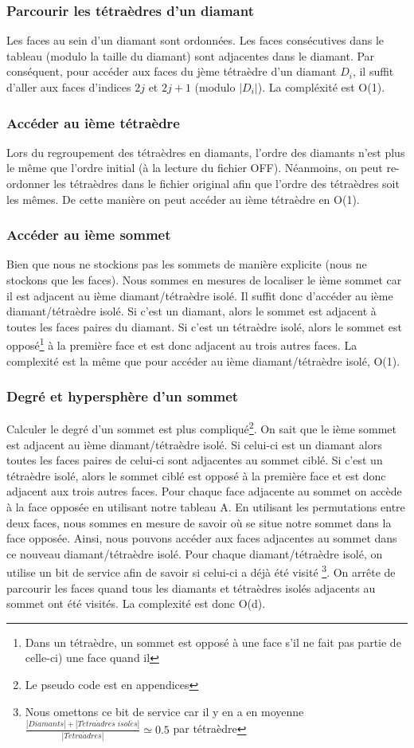 \subsubsection{Parcourir les tétraèdres d'un diamant}
\noindent
Les faces au sein d'un diamant sont ordonnées. Les faces consécutives dans le tableau (modulo la taille du diamant) sont adjacentes dans le diamant. Par conséquent, pour accéder aux faces du jème tétraèdre d'un diamant $D_i$, il suffit d'aller aux faces d'indices $2j$ et $2j+1$ (modulo $|D_i|$). La compléxité est O(1).
\subsubsection{Accéder au ième tétraèdre}
\noindent
Lors du regroupement des tétraèdres en diamants, l'ordre des diamants n'est plus le même que l'ordre initial (à la lecture du fichier OFF). Néanmoins, on peut re-ordonner les tétraèdres dans le fichier original afin que l'ordre des tétraèdres soit les mêmes. De cette manière on peut accéder au ième tétraèdre en O(1).
\subsubsection{Accéder au ième sommet}
\noindent
Bien que nous ne stockions pas les sommets de manière explicite (nous ne stockons que les faces). Nous sommes en mesures de localiser le ième sommet car il est adjacent au ième diamant/tétraèdre isolé.
Il suffit donc d'accéder au ième diamant/tétraèdre isolé. Si c'est un diamant, alors le sommet est adjacent à toutes les faces paires du diamant. Si c'est un tétraèdre isolé, alors le sommet est opposé\footnote{Dans un tétraèdre, un sommet est opposé à une face s'il ne fait pas partie de celle-ci) une face quand il} à la première face et est donc adjacent au trois autres faces. La complexité est la même que pour accéder au ième diamant/tétraèdre isolé, O(1).
\subsubsection{Degré et hypersphère d'un sommet}
\noindent
Calculer le degré d'un sommet est plus compliqué\footnote{Le pseudo code est en appendices}. On sait que le ième sommet est adjacent au ième diamant/tétraèdre isolé. Si celui-ci est un diamant alors toutes les faces paires de celui-ci sont adjacentes au sommet ciblé. Si c'est un tétraèdre isolé, alors le sommet ciblé est opposé à la première face et est donc adjacent aux trois autres faces. Pour chaque face adjacente au sommet on accède à la face opposée en utilisant notre tableau A. En utilisant les permutations entre deux faces, nous sommes en mesure de savoir où se situe notre sommet dans la face opposée. Ainsi, nous pouvons accéder aux faces adjacentes au sommet dans ce nouveau diamant/tétraèdre isolé. Pour chaque diamant/tétraèdre isolé, on utilise un bit de service afin de savoir si celui-ci a déjà été visité \footnote{Nous omettons ce bit de service car il y en a en moyenne $\frac{|Diamants| + |T\acute{e}tra\grave{a}dres \; isol\acute{e}s|}{|T\acute{e}tra\grave{a}dres|}\simeq 0.5$ par tétraèdre}. On arrête de parcourir les faces quand tous les diamants et tétraèdres isolés adjacents au sommet ont été visités. La complexité est donc O(d).
